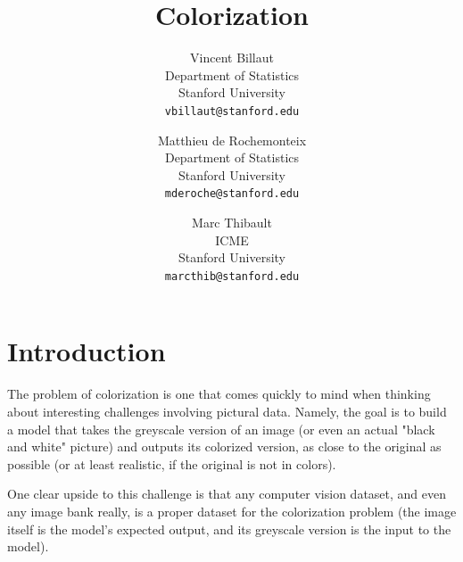 \documentclass[10pt,twocolumn,letterpaper]{article}
\begin{document}
\title{Colorization}

\author{Vincent Billaut\\
Department of Statistics\\
Stanford University\\
{\tt\small vbillaut@stanford.edu}
\and
Matthieu de Rochemonteix\\
Department of Statistics\\
Stanford University\\
{\tt\small mderoche@stanford.edu}
\and
Marc Thibault\\
ICME\\
Stanford University\\
{\tt\small marcthib@stanford.edu}
}

\maketitle



%   

\section{Introduction}

The problem of colorization is one that comes quickly to mind when thinking about interesting challenges involving pictural data. Namely, the goal is to build a model that takes the greyscale version of an image (or even an actual "black and white" picture) and outputs its colorized version, as close to the original as possible (or at least realistic, if the original is not in colors).

One clear upside to this challenge is that any computer vision dataset, and even any image bank really, is a proper dataset for the colorization problem (the image itself is the model's expected output, and its greyscale version is the input to the model).
\end{document}
